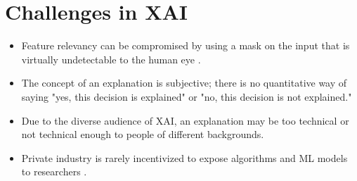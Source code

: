 \section{Challenges in XAI} \label{sec:Challenges}

\begin{itemize}
    \item Feature relevancy can be compromised by using a mask on the input that is virtually undetectable to the human eye \cite{DBLP:journals/corr/abs-1812-00891}.

    \item The concept of an explanation is subjective; there is no quantitative way of saying "yes, this decision is explained" or "no, this decision is not explained." \cite{Bibal2016}

    \item Due to the diverse audience of XAI, an explanation may be too technical or not technical enough to people of different backgrounds.
    
    \item Private industry is rarely incentivized to expose algorithms and ML models to researchers \cite{Veale:2018:FAD:3173574.3174014}.
\end{itemize}
